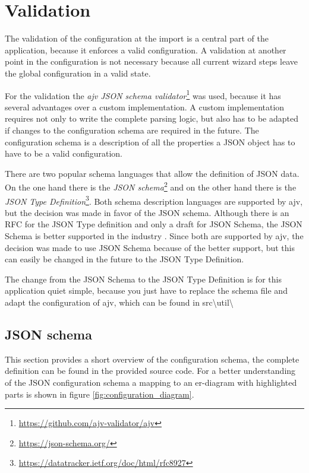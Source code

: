 \section{Validation}
\label{sec:validation}

The validation of the configuration at the import is a central part of the application, because it enforces a valid configuration. A validation at another point in the configuration is not necessary because all current wizard steps leave the global configuration in a valid state.

For the validation the \textit{ajv JSON schema validator}\footnote{\url{https://github.com/ajv-validator/ajv}} was used, because it has several advantages over a custom implementation. A custom implementation requires not only to write the complete parsing logic, but also has to be adapted if changes to the configuration schema are required in the future. The configuration schema is a description of all the properties a JSON object has to have to be a valid configuration.

There are two popular schema languages that allow the definition of JSON data. On the one hand there is the \textit{JSON schema}\footnote{\url{https://json-schema.org/}} and on the other hand there is the \textit{JSON Type Definition}\footnote{\url{https://datatracker.ietf.org/doc/html/rfc8927}}. Both schema description languages are supported by ajv, but the decision was made in favor of the JSON schema. Although there is an RFC for the JSON Type definition and only a draft for JSON Schema, the JSON Schema is better supported in the industry \cite{ajv_comparison}. Since both are supported by ajv, the decision was made to use JSON Schema because of the better support, but this can easily be changed in the future to the JSON Type Definition.

The change from the JSON Schema to the JSON Type Definition is for this application quiet simple, because you just have to replace the schema file and adapt the configuration of ajv, which can be found in src\textbackslash util\textbackslash

\subsection{JSON schema}
This section provides a short overview of the configuration schema, the complete definition can be found in the provided source code. For a better understanding of the JSON configuration schema a mapping to an er-diagram with highlighted parts is shown in figure \ref{fig:configuration_diagram}.

